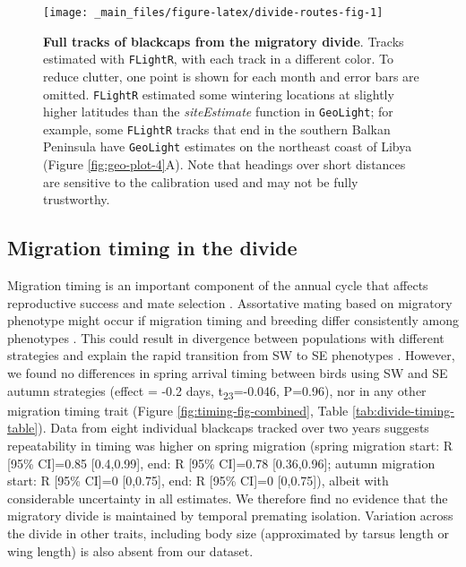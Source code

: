 \documentclass[a4paper, nobind]{templates/ociamthesis}
\begin{document}
\begin{figure}
\texttt{[image: \_main\_files/figure-latex/divide-routes-fig-1]} \caption{\textbf{Full tracks of blackcaps from the migratory divide}. Tracks estimated with \texttt{FLightR}, with each track in a different color. To reduce clutter, one point is shown for each month and error bars are omitted. \texttt{FLightR} estimated some wintering locations at slightly higher latitudes than the \emph{siteEstimate} function in \texttt{GeoLight}; for example, some \texttt{FLightR} tracks that end in the southern Balkan Peninsula have \texttt{GeoLight} estimates on the northeast coast of Libya (Figure \ref{fig:geo-plot-4}A). Note that headings over short distances are sensitive to the calibration used and may not be fully trustworthy.}\label{fig:divide-routes-fig}
\end{figure}

\hypertarget{migration-timing-in-the-divide}{%
\subsection{Migration timing in the divide}\label{migration-timing-in-the-divide}}

Migration timing is an important component of the annual cycle that affects reproductive success \autocite{taylorRoleAllochronySpeciation2017,winkerOriginSpeciesHeteropatric2010} and mate selection \autocite{bearhopAssortativeMatingMechanism2005}. Assortative mating based on migratory phenotype might occur if migration timing and breeding differ consistently among phenotypes \autocite{bearhopAssortativeMatingMechanism2005}. This could result in divergence between populations with different strategies and explain the rapid transition from SW to SE phenotypes \autocite{irwinSiberianMigratoryDivides2005}. However, we found no differences in spring arrival timing between birds using SW and SE autumn strategies (effect = -0.2 days, t\textsubscript{23}=-0.046, P=0.96), nor in any other migration timing trait (Figure \ref{fig:timing-fig-combined}, Table \ref{tab:divide-timing-table}). Data from eight individual blackcaps tracked over two years suggests repeatability in timing was higher on spring migration (spring migration start: R {[}95\% CI{]}=0.85 {[}0.4,0.99{]}, end: R {[}95\% CI{]}=0.78 {[}0.36,0.96{]}; autumn migration start: R {[}95\% CI{]}=0 {[}0,0.75{]}, end: R {[}95\% CI{]}=0 {[}0,0.75{]}), albeit with considerable uncertainty in all estimates. We therefore find no evidence that the migratory divide is maintained by temporal premating isolation. Variation across the divide in other traits, including body size (approximated by tarsus length or wing length) is also absent from our dataset.
\end{document}
